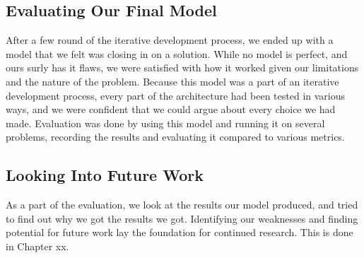 \subsection{Evaluating Our Final Model}
After a few round of the iterative development process, we ended up with a model that we felt was closing in on a solution. While no model is perfect, and ours surly has it flaws, we were satisfied with how it worked given our limitations and the nature of the problem. Because this model was a part of an iterative development process, every part of the architecture had been tested in various ways, and we were confident that we could argue about every choice we had made. Evaluation was done by using this model and running it on several problems, recording the results and evaluating it compared to various metrics.

\subsection{Looking Into Future Work}
As a part of the evaluation, we look at the results our model produced, and tried to find out why we got the results we got. Identifying our weaknesses and finding potential for future work lay the foundation for continued research. This is done in Chapter xx.